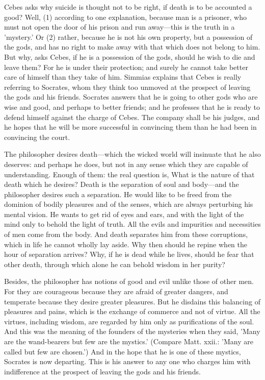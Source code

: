 Cebes asks why suicide is thought not to be right, if death is to be
accounted a good? Well, (1) according to one explanation, because man is a
prisoner, who must not open the door of his prison and run away—this
is the truth in a 'mystery.' Or (2) rather, because he is not his own
property, but a possession of the gods, and has no right to make away with
that which does not belong to him. But why, asks Cebes, if he is a
possession of the gods, should he wish to die and leave them? For he is
under their protection; and surely he cannot take better care of himself
than they take of him. Simmias explains that Cebes is really referring to
Socrates, whom they think too unmoved at the prospect of leaving the gods
and his friends. Socrates answers that he is going to other gods who are
wise and good, and perhaps to better friends; and he professes that he is
ready to defend himself against the charge of Cebes. The company shall be
his judges, and he hopes that he will be more successful in convincing
them than he had been in convincing the court.

The philosopher desires death—which the wicked world will insinuate
that he also deserves: and perhaps he does, but not in any sense which
they are capable of understanding. Enough of them: the real question is,
What is the nature of that death which he desires? Death is the separation
of soul and body—and the philosopher desires such a separation. He
would like to be freed from the dominion of bodily pleasures and of the
senses, which are always perturbing his mental vision. He wants to get rid
of eyes and ears, and with the light of the mind only to behold the light
of truth. All the evils and impurities and necessities of men come from
the body. And death separates him from these corruptions, which in life he
cannot wholly lay aside. Why then should he repine when the hour of
separation arrives? Why, if he is dead while he lives, should he fear that
other death, through which alone he can behold wisdom in her purity?

Besides, the philosopher has notions of good and evil unlike those of
other men. For they are courageous because they are afraid of greater
dangers, and temperate because they desire greater pleasures. But he
disdains this balancing of pleasures and pains, which is the exchange of
commerce and not of virtue. All the virtues, including wisdom, are
regarded by him only as purifications of the soul. And this was the
meaning of the founders of the mysteries when they said, 'Many are the
wand-bearers but few are the mystics.' (Compare Matt. xxii.: 'Many are
called but few are chosen.') And in the hope that he is one of these
mystics, Socrates is now departing. This is his answer to any one who
charges him with indifference at the prospect of leaving the gods and his
friends.

